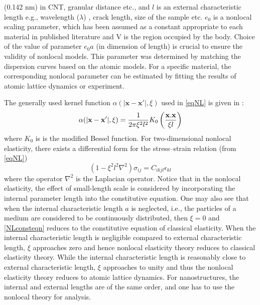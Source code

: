 (0.142 nm) in CNT, granular distance etc., and $l$ is an external
characteristic length e.g., wavelength ($\lambda$) , crack length, size of the
sample etc. $e_0$ is a nonlocal scaling parameter, which has been
assumed as a constant appropriate to each material in published
literature and V is the region occupied by the body. Choice of the
value of parameter $e_0a$  (in dimension of length) is crucial to ensure
the validity of nonlocal models. This parameter was determined by
matching the dispersion curves based on the atomic models\cite{eringen1983differential}. For
a specific material, the corresponding nonlocal parameter can be
estimated by fitting the results of atomic lattice dynamics or
experiment.

The generally used kernel function $\alpha(|\mathbf{x-x'}|,\xi)$ used in \ref{eqNL} is given in \cite{eringen1972linear}:\\
\begin{equation}
\alpha(|\mathbf{x-x'}|,\xi) = \dfrac{1}{2 \pi \xi^2 l^2} K_0\left(\frac{\bf{x.x}}{\xi l}\right)
\end{equation}
where $K_0$ is is the modified Bessel function.
For two-dimensional nonlocal elasticity, there exists a differential form for the stress–strain relation (from \eqref{eqNL})\cite{eringen1972linear,eringen1976nonlocal,eringen1983differential,eringen1972nonlocal}\\
\begin{equation}
\left(1-\xi^2 l^2 \nabla^2\right)\sigma_{ij} = C_{ikjl}\epsilon_{kl} \label{NLconsteqn}
\end{equation}
where the operator $\nabla^2$ is the Laplacian operator. Notice that in the
nonlocal elasticity, the effect of small-length scale is considered by
incorporating the internal parameter length into the constitutive
equation. One may also see that when the internal characteristic
length $a$ is neglected, i.e., the particles of a medium are considered
to be continuously distributed, then $\xi =0$ and \eqref{NLconsteqn} reduces to the
constitutive equation of classical elasticity. When the internal
characteristic length is negligible compared to external characteristic length, $\xi$ approaches zero and hence nonlocal elasticity theory reduces to classical elasticity theory. While the internal characteristic length is reasonably close to external characteristic length, $\xi$ approaches to unity and thus the nonlocal elasticity
theory reduces to atomic lattice dynamics. For nanostructures, the
internal and external lengths are of the same order, and one has to
use the nonlocal theory for analysis.
